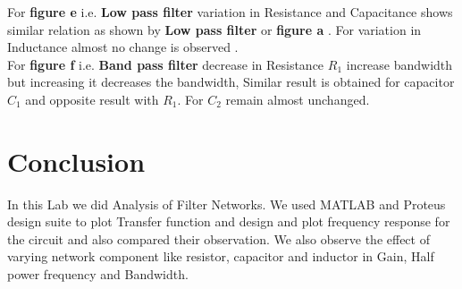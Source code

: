 \documentclass[a4paper,11pt]{article}
\begin{document}
For \textbf{figure e} i.e. \textbf{Low pass filter} variation in Resistance and Capacitance shows similar relation as shown by \textbf{Low pass filter} or \textbf{figure a} . For variation  in Inductance  almost no change is observed .\\

For \textbf{figure f} i.e. \textbf{Band pass filter} decrease in Resistance $R_1$ increase bandwidth but increasing it decreases the bandwidth, Similar result is obtained for capacitor $C_1$ and opposite result with $R_1$. For $C_2$ remain almost unchanged.



\section{Conclusion}
In this Lab  we did Analysis of Filter Networks. We used MATLAB and Proteus  design suite to plot Transfer function  and design and plot frequency response for the circuit and also compared their observation. We also observe the effect of varying network component like resistor, capacitor and inductor in Gain, Half power frequency and Bandwidth.
\end{document}
